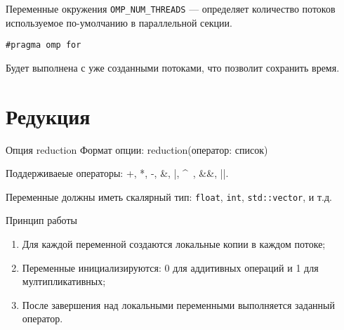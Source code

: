 \begin{frame}{Переменные окружения}
\texttt{OMP_NUM_THREADS} --- определяет количество потоков используемое по-умолчанию в параллельной секции.
\end{frame}

\begin{frame}[fragile]

\begin{lstlisting}
#pragma omp for
\end{lstlisting}

Будет выполнена с уже созданными потоками, что позволит сохранить время.

\end{frame}

\section{Редукция}

\begin{frame}{Опция reduction}
Формат опции: reduction(оператор: список)

\bigskip

Поддерживаеые операторы: +, *, -, \&, |, \^~, \&\&, ||.

\bigskip

Переменные должны иметь скалярный тип: \texttt{float}, \texttt{int},
\texttt{std::vector}, и т.д.
\end{frame}

\begin{frame}{Принцип работы}
\begin{enumerate}
    \item Для каждой переменной создаются локальные копии в каждом потоке;
    \item Переменные инициализируются: 0 для аддитивных операций и 1 для
    мултипликативных;
    \item После завершения над локальными переменными выполняется заданный
    оператор.
\end{enumerate}
\end{frame}


